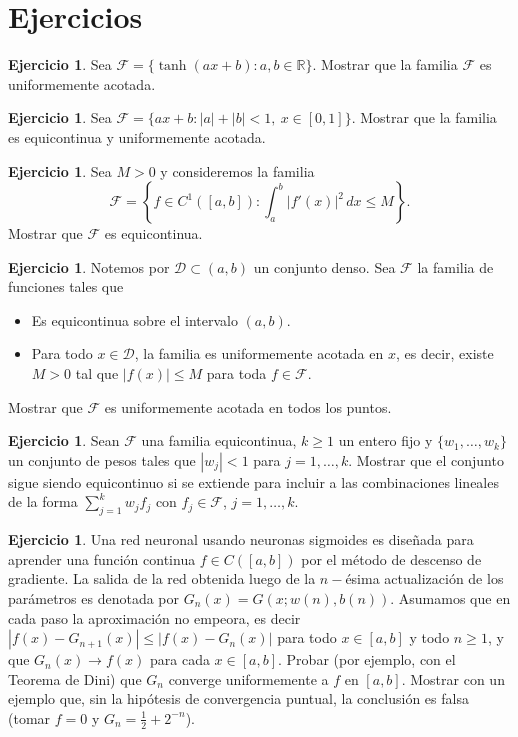 \documentclass[12pt, a4paper]{amsbook}
\newcommand{\R}{{\mathbb R}}
\newcommand{\F}{{\mathcal F}}
\newcommand{\D}{{\mathcal D}}
\theoremstyle{remark}
\theoremstyle{definition}
\newtheorem{ejer}[teo]{Ejercicio}
\numberwithin{section}{chapter}
\numberwithin{subsection}{section}
\numberwithin{equation}{section}
\numberwithin{figure}{chapter}
\begin{document}
\section{Ejercicios}\label{sec.c7.7}

\begin{ejer}
Sea $\F=\{\tanh(ax+b)\colon a, b\in\R\}$. Mostrar que la familia $\F$ es uniformemente acotada.
\end{ejer}

\begin{ejer}
Sea $\F=\{ax+b\colon |a|+|b|<1,\ x\in [0, 1]\}$. Mostrar que la familia es equicontinua y uniformemente acotada.
\end{ejer}

\begin{ejer}
Sea $M>0$ y consideremos la familia
$$
\F = \left\{f\in C^1([a, b])\colon \int_a^b |f'(x)|^2\, dx \le M\right\}.
$$
Mostrar que $\F$ es equicontinua.
\end{ejer}

\begin{ejer}
Notemos por $\D\subset (a, b)$ un conjunto denso. Sea $\F$ la familia de funciones tales que
\begin{itemize}
\item[(a)] Es equicontinua sobre el intervalo $(a, b)$.
\item[(b)] Para todo $x\in \D$, la familia es uniformemente acotada en $x$, es decir, existe $M>0$ tal que $|f(x)|\le M$ para toda $f\in\F$. 
\end{itemize}
Mostrar que $\F$ es uniformemente acotada en todos los puntos.
\end{ejer}

\begin{ejer}
Sean $\F$ una familia equicontinua, $k\ge 1$ un entero fijo y $\{w_1,\dots,w_k\}$ un conjunto de pesos tales que $|w_j|<1$ para $j=1,\dots,k$. Mostrar que el conjunto sigue siendo equicontinuo si se extiende para incluir a las combinaciones lineales de la forma $\sum_{j=1}^k w_j f_j$ con $f_j\in\F$, $j=1,\dots,k$.
\end{ejer}

\begin{ejer}
Una red neuronal usando neuronas sigmoides es diseñada para aprender una función continua $f\in C([a, b])$ por el método de descenso de gradiente. La salida de la red obtenida luego de la $n-$ésima actualización de los parámetros es denotada por $G_n(x) = G(x; w(n), b(n))$. Asumamos que en cada paso la aproximación no empeora, es decir $|f(x)-G_{n+1}(x)| \le |f(x) - G_n(x)|$ para todo $x\in [a, b]$ y todo $n\ge 1$, y que $G_n(x)\to f(x)$ para cada $x\in[a,b]$. Probar (por ejemplo, con el Teorema de Dini) que $G_n$ converge uniformemente a $f$ en $[a, b]$. Mostrar con un ejemplo que, sin la hipótesis de convergencia puntual, la conclusión es falsa (tomar $f=0$ y $G_n=\frac12+2^{-n}$).
\end{ejer}
\end{document}
